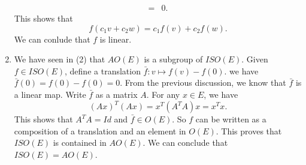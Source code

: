 \documentclass[a4paper, 12pt]{article}
\begin{document}
\begin{solution}
\begin{enumerate}
\begin{align*}
                                    =&0.
\end{align*}
This shows that 
\[f(c_1v+c_2w)=c_1f(v)+c_2f(w).\]
We can conlude that \(f\) is linear.
\item We have seen in (2) that \(AO(E)\) is a subgroup of \(ISO(E)\). Given \(f\in ISO(E)\), define a translation \(\bar{f}: v\mapsto f(v)-f(0)\). we have 
\(\bar{f}(0)=f(0)-f(0)=0\). From the previous discussion, we know that \(\bar{f}\) is a linear map. Write \(\bar{f}\) as a matrix \(A\). For any \(x\in E\), we have 
\[(Ax)^T(Ax)=x^T(A^TA)x=x^Tx.\]
This shows that \(A^TA=Id\) and \(\bar{f}\in O(E)\). So \(f\) can be written as a composition of a translation and an element in \(O(E)\). This proves that \(ISO(E)\) is contained in \(AO(E)\). We 
can conclude that \(ISO(E)=AO(E)\).
\end{enumerate} 
\end{solution}
\end{document}

